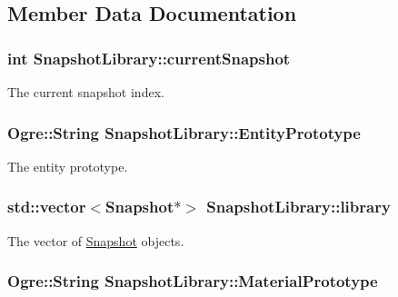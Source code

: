 \subsection{\-Member \-Data \-Documentation}
\hypertarget{classSnapshotLibrary_ac57409313d63db08bf743da47c768781}{
\subsubsection[{current\-Snapshot}]{\setlength{\rightskip}{0pt plus 5cm}int {\bf \-Snapshot\-Library\-::current\-Snapshot}}}\label{classSnapshotLibrary_ac57409313d63db08bf743da47c768781}
\-The current snapshot index. \hypertarget{classSnapshotLibrary_a968263cf5e86e9d2be54bae17fd69b00}{
\subsubsection[{\-Entity\-Prototype}]{\setlength{\rightskip}{0pt plus 5cm}\-Ogre\-::\-String {\bf \-Snapshot\-Library\-::\-Entity\-Prototype}}}\label{classSnapshotLibrary_a968263cf5e86e9d2be54bae17fd69b00}
\-The entity prototype. \hypertarget{classSnapshotLibrary_adc6f783d638a9ff4744b16bfa66b8953}{
\subsubsection[{library}]{\setlength{\rightskip}{0pt plus 5cm}std\-::vector$<${\bf \-Snapshot}$\ast$$>$ {\bf \-Snapshot\-Library\-::library}}}\label{classSnapshotLibrary_adc6f783d638a9ff4744b16bfa66b8953}
\-The vector of \hyperlink{classSnapshot}{\-Snapshot} objects. \hypertarget{classSnapshotLibrary_a34479d4ccada0297ff80a41a4adf5100}{
\subsubsection[{\-Material\-Prototype}]{\setlength{\rightskip}{0pt plus 5cm}\-Ogre\-::\-String {\bf \-Snapshot\-Library\-::\-Material\-Prototype}}}\label{classSnapshotLibrary_a34479d4ccada0297ff80a41a4adf5100}
